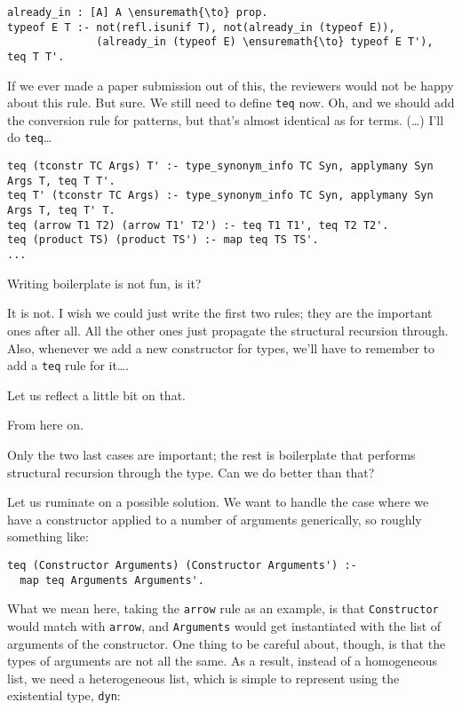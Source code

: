 \begin{verbatim}
already_in : [A] A \ensuremath{\to} prop.
typeof E T :- not(refl.isunif T), not(already_in (typeof E)),
              (already_in (typeof E) \ensuremath{\to} typeof E T'), teq T T'.
\end{verbatim}

\heroSTUDENT{} If we ever made a paper submission out of this, the reviewers
would not be happy about this rule. But sure. We still need to define
\texttt{teq} now. Oh, and we should add the conversion rule for
patterns, but that's almost identical as for terms. (\ldots{}) I'll do
\texttt{teq}\ldots{}

\begin{verbatim}
teq (tconstr TC Args) T' :- type_synonym_info TC Syn, applymany Syn Args T, teq T T'.
teq T' (tconstr TC Args) :- type_synonym_info TC Syn, applymany Syn Args T, teq T' T.
teq (arrow T1 T2) (arrow T1' T2') :- teq T1 T1', teq T2 T2'.
teq (product TS) (product TS') :- map teq TS TS'.
...
\end{verbatim}

\heroADVISOR{} Writing boilerplate is not fun, is it?

\heroSTUDENT{} It is not. I wish we could just write the first two rules; they
are the important ones after all. All the other ones just propagate the
structural recursion through. Also, whenever we add a new constructor
for types, we'll have to remember to add a \texttt{teq} rule for
it\ldots{}.

\heroADVISOR{} Let us reflect a little bit on that.

\TODO{} From here on.

Only the two last cases are important; the rest is boilerplate that
performs structural recursion through the type. Can we do better than
that?

Let us ruminate on a possible solution. We want to handle the case where
we have a constructor applied to a number of arguments generically, so
roughly something like:

\begin{verbatim}
teq (Constructor Arguments) (Constructor Arguments') :-
  map teq Arguments Arguments'.
\end{verbatim}

What we mean here, taking the \texttt{arrow} rule as an example, is that
\texttt{Constructor} would match with \texttt{arrow}, and
\texttt{Arguments} would get instantiated with the list of arguments of
the constructor. One thing to be careful about, though, is that the
types of arguments are not all the same. As a result, instead of a
homogeneous list, we need a heterogeneous list, which is simple to
represent using the existential type, \texttt{dyn}:


